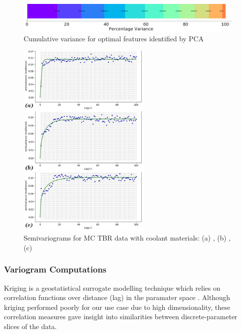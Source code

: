 \begin{figure}[h]
  \centering
    \includegraphics[width=0.6\linewidth]{fig2_pca.jpg}
    \caption{Cumulative variance for optimal features identified by PCA}
  \label{fig:pca}
\end{figure}

\begin{figure}
  \vspace{-30pt}
  \begin{center}
    \hspace*{-.3\columnsep}\includegraphics[width=0.58\textwidth]{fig3_allvar.jpg}
	\caption{Semivariograms for MC TBR data with coolant materials: (a) ,
	(b) , (c) }
    \label{fig:var}
  \end{center}
  \vspace{-50pt}
\end{figure}

\subsubsection{Variogram Computations}


Kriging is a geostatistical surrogate modelling technique which relies on correlation functions over distance (lag) in the paramater space \cite{Bouhlel2018}. Although kriging performed poorly for our use case due to high dimensionality, these correlation measures gave insight into similarities between discrete-parameter slices of the data.

